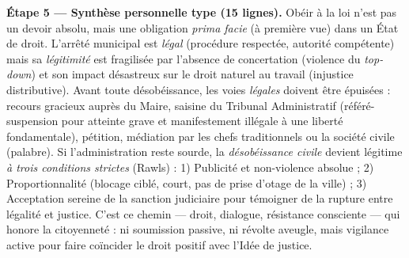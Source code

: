 \documentclass[11pt]{article}
\newcommand{\cle}[1]{{\popxbold\color{popdark}#1}}
\begin{document}
\begin{exoresolu}
\textbf{Étape 5 — Synthèse personnelle type (15 lignes).}
\guillemotleft Obéir à la loi n'est pas un devoir absolu, mais une obligation \emph{prima facie} (à première vue) dans un État de droit. L'arrêté municipal est \emph{légal} (procédure respectée, autorité compétente) mais sa \emph{légitimité} est fragilisée par l'absence de concertation (violence du \emph{top-down}) et son impact désastreux sur le droit naturel au travail (injustice distributive). Avant toute désobéissance, les voies \emph{légales} doivent être épuisées : recours gracieux auprès du Maire, saisine du Tribunal Administratif (référé-suspension pour atteinte grave et manifestement illégale à une liberté fondamentale), pétition, médiation par les chefs traditionnels ou la société civile (palabre). Si l'administration reste sourde, la \emph{désobéissance civile} devient légitime \emph{à trois conditions strictes} (Rawls) : 1) Publicité et non-violence absolue ; 2) Proportionnalité (blocage ciblé, court, pas de prise d'otage de la ville) ; 3) Acceptation sereine de la sanction judiciaire pour témoigner de la rupture entre légalité et justice. C'est ce chemin — droit, dialogue, résistance consciente — qui honore la \cle{citoyenneté} : ni soumission passive, ni révolte aveugle, mais vigilance active pour faire coïncider le droit positif avec l'Idée de justice. \guillemotright
\end{exoresolu}
\end{document}
